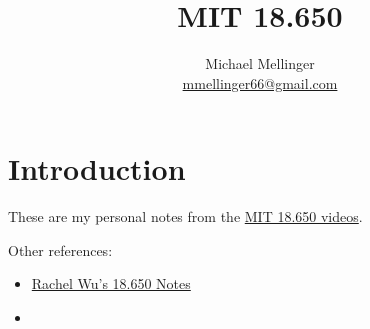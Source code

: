 \documentclass{article}
\title{MIT 18.650}
\author{Michael Mellinger \\ \href{mailto:mmellinger66@gmail.com}{mmellinger66@gmail.com} }
\begin{document}
\maketitle
\tableofcontents
\clearpage

\section{Introduction}

These are my personal notes from the \href{https://ocw.mit.edu/courses/18-650-statistics-for-applications-fall-2016/}{MIT 18.650 videos}.

Other references:

\begin{itemize}
    \item \href{http://people.csail.mit.edu/rmwu/static/files/notes/18-650-notes.pdf}{Rachel Wu's 18.650 Notes}
    \item 
\end{itemize}
\end{document}
